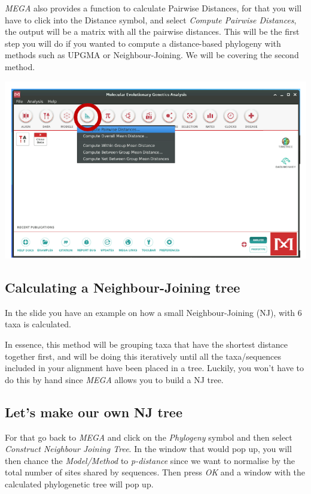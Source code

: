 \documentclass[
  letterpaper,
]{book}
\begin{document}
\emph{MEGA} also provides a function to calculate Pairwise Distances,
for that you will have to click into the Distance symbol, and select
\emph{Compute Pairwise Distances}, the output will be a matrix with all
the pairwise distances. This will be the first step you will do if you
wanted to compute a distance-based phylogeny with methods such as UPGMA
or Neighbour-Joining. We will be covering the second method.

\includegraphics{assets/images/chapters/phylogenomics/8.png}

\hypertarget{calculating-a-neighbour-joining-tree}{%
\subsection{Calculating a Neighbour-Joining
tree}\label{calculating-a-neighbour-joining-tree}}

In the slide you have an example on how a small Neighbour-Joining (NJ),
with 6 taxa is calculated.

In essence, this method will be grouping taxa that have the shortest
distance together first, and will be doing this iteratively until all
the taxa/sequences included in your alignment have been placed in a
tree. Luckily, you won't have to do this by hand since \emph{MEGA}
allows you to build a NJ tree.

\hypertarget{lets-make-our-own-nj-tree}{%
\subsection{Let's make our own NJ
tree}\label{lets-make-our-own-nj-tree}}

For that go back to \emph{MEGA} and click on the \emph{Phylogeny} symbol
and then select \emph{Construct Neighbour Joining Tree}. In the window
that would pop up, you will then chance the \emph{Model/Method} to
\emph{p-distance} since we want to normalise by the total number of
sites shared by sequences. Then press \emph{OK} and a window with the
calculated phylogenetic tree will pop up.
\end{document}
